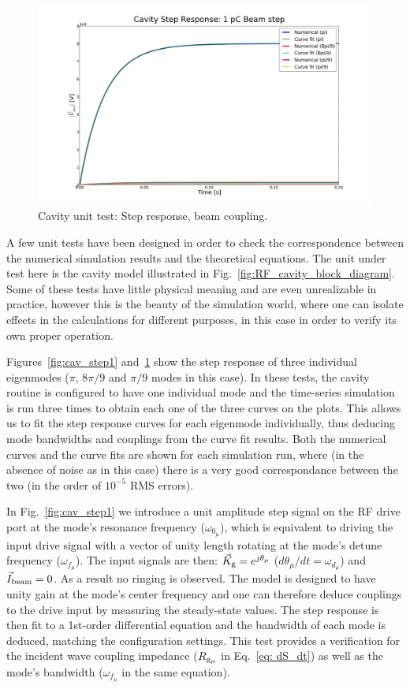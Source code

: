 \documentclass[a4paper,12pt]{article}
\begin{document}
\begin{figure}
\centering
\includegraphics[scale=0.26]{../figures/cavity_test_beam.png}
\caption{Cavity unit test: Step response, beam coupling.}
\label{fig:cav_step2}
\end{figure}

A few unit tests have been designed in order to check the correspondence between the numerical simulation results and the theoretical equations. The unit under test here is the cavity model illustrated in Fig.~\ref{fig:RF_cavity_block_diagram}. Some of these tests have little physical meaning and are even unrealizable in practice, however this is the beauty of the simulation world, where one can isolate effects in the calculations for different purposes, in this case in order to verify its own proper operation.

Figures~\ref{fig:cav_step1} and~\ref{fig:cav_step2} show the step response of three individual eigenmodes ($\pi$, $8\pi/9$ and $\pi/9$ modes in this case). In these tests, the cavity routine is configured to have one individual mode and the time-series simulation is run three times to obtain each one of the three curves on the plots. This allows us to fit the step response curves for each eigenmode individually, thus deducing mode bandwidths and couplings from the curve fit results. Both the numerical curves and the curve fits are shown for each simulation run, where (in the absence of noise as in this case) there is a very good correspondance between the two (in the order of $10^{-5}$ RMS errors).

In Fig.~\ref{fig:cav_step1} we introduce a unit amplitude step signal on the RF drive port at the mode's resonance frequency ($\omega_{0_{\mu}}$), which is equivalent to driving the input drive signal with a vector of unity length rotating at the mode's detune frequency ($\omega_{f_{\mu}}$). The input signals are then: $\vec K_{\rm g}=e^{j\theta_{\mu}}$ ($d\theta_{\mu}/dt = \omega_{d_\mu}$) and $\vec I_{\rm beam}=0$. As a result no ringing is observed. The model is designed to have unity gain at the mode's center frequency and one can therefore deduce couplings to the drive input by measuring the steady-state values. The step response is then fit to a 1st-order differential equation and the bandwidth of each mode is deduced, matching the configuration settings. This test provides a verification for the incident wave coupling impedance ($R_{\rm g_{\mu}}$ in Eq.~\ref{eq: dS_dt}) as well as the mode's bandwidth ($\omega_{f_{\mu}}$ in the same equation).
\end{document}
